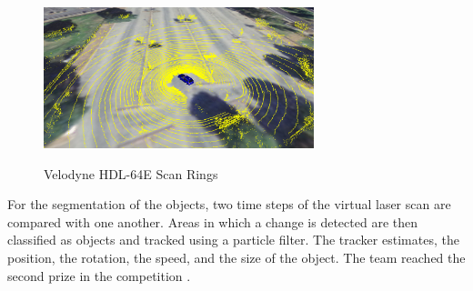 \documentclass[11pt,oneside,openright]{mpreport}
\begin{document}
\begin{figure}[!ht]
\begin{center}
\caption{Velodyne HDL-64E Scan Rings \cite{Montemerlo2009}}
\includegraphics[width=0.7\textwidth]{bilder/stanford_junior_velodyne.png}
\label{stanford_junior_velodyne}
\end{center}
\end{figure}


For the segmentation of the objects, two time steps of the virtual laser scan are compared with one another. Areas in which a change is detected are then classified 
as objects and tracked using a particle filter. The tracker estimates, the position, the rotation, the speed, and the size of the object.
The team reached the second prize in the competition \cite{Release2007}.
\end{document}
